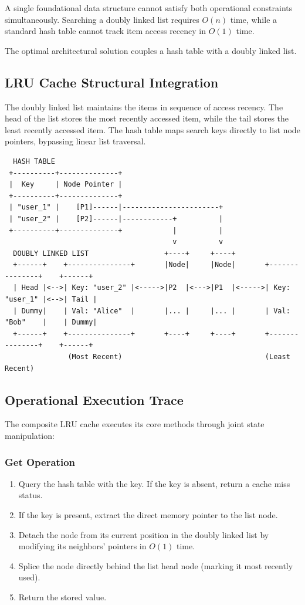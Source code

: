 \documentclass[12pt]{report}
\begin{document}
A single foundational data structure cannot satisfy both operational constraints simultaneously. Searching a doubly linked list requires $O(n)$ time, while a standard hash table cannot track item access recency in $O(1)$ time. 

The optimal architectural solution couples a hash table with a doubly linked list.

\subsection{LRU Cache Structural Integration}

The doubly linked list maintains the items in sequence of access recency. The head of the list stores the most recently accessed item, while the tail stores the least recently accessed item. The hash table maps search keys directly to list node pointers, bypassing linear list traversal.

\begin{verbatim}
  HASH TABLE
 +----------+--------------+
 |  Key     | Node Pointer |
 +----------+--------------+
 | "user_1" |    [P1]------|-----------------------+
 | "user_2" |    [P2]------|------------+          |
 +----------+--------------+            |          |
                                        v          v
  DOUBLY LINKED LIST                  +----+     +----+
  +------+    +---------------+       |Node|     |Node|       +---------------+    +------+
  | Head |<-->| Key: "user_2" |<----->|P2  |<--->|P1  |<----->| Key: "user_1" |<-->| Tail |
  | Dummy|    | Val: "Alice"  |       |... |     |... |       | Val: "Bob"    |    | Dummy|
  +------+    +---------------+       +----+     +----+       +---------------+    +------+
               (Most Recent)                                  (Least Recent)
\end{verbatim}

\subsection{Operational Execution Trace}

The composite LRU cache executes its core methods through joint state manipulation:

\subsubsection{Get Operation}
\begin{enumerate}
    \item Query the hash table with the key. If the key is absent, return a cache miss status.
    \item If the key is present, extract the direct memory pointer to the list node.
    \item Detach the node from its current position in the doubly linked list by modifying its neighbors' pointers in $O(1)$ time.
    \item Splice the node directly behind the list head node (marking it most recently used).
    \item Return the stored value.
\end{enumerate}
\end{document}
